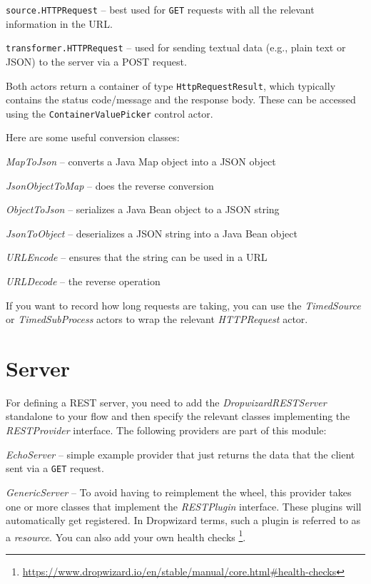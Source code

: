 \documentclass[a4paper]{book}
\begin{document}
\begin{tight_itemize}
    \item \texttt{source.HTTPRequest} -- best used for \texttt{GET} requests
    with all the relevant information in the URL.
    \item \texttt{transformer.HTTPRequest} -- used for sending textual data (e.g.,
    plain text or JSON) to the server via a POST request.
\end{tight_itemize}
Both actors return a container of type \texttt{HttpRequestResult}, which typically
contains the status code/message and the response body. These can be accessed
using the \texttt{ContainerValuePicker} control actor.

Here are some useful conversion classes:
\begin{tight_itemize}
    \item \textit{MapToJson} -- converts a Java Map object into a JSON object
    \item \textit{JsonObjectToMap} -- does the reverse conversion
    \item \textit{ObjectToJson} -- serializes a Java Bean object to a JSON string
    \item \textit{JsonToObject} -- deserializes a JSON string into a Java Bean object
    \item \textit{URLEncode} -- ensures that the string can be used in a URL
    \item \textit{URLDecode} -- the reverse operation
\end{tight_itemize}

If you want to record how long requests are taking, you can use the \textit{TimedSource}
or \textit{TimedSubProcess} actors to wrap the relevant \textit{HTTPRequest} actor.


\clearpage
\section{Server}
For defining a REST server, you need to add the \textit{DropwizardRESTServer} standalone
to your flow and then specify the relevant classes implementing the \textit{RESTProvider}
interface. The following providers are part of this module:
\begin{tight_itemize}
    \item \textit{EchoServer} -- simple example provider that just returns the data that the
    client sent via a \texttt{GET} request.
    \item \textit{GenericServer} -- To avoid having to reimplement the wheel, this provider
    takes one or more classes that implement the \textit{RESTPlugin} interface. These plugins
    will automatically get registered. In Dropwizard terms, such a plugin is referred to as
    a \textit{resource}. You can also add your own health checks
    \footnote{\url{https://www.dropwizard.io/en/stable/manual/core.html\#health-checks}{}}.
\end{tight_itemize}
\end{document}
